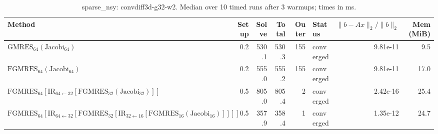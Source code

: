\begin{table}[t]
\centering
\small
\caption{sparse_nsy: convdiff3d-g32-w2. Median over 10 timed runs after 3 warmups; times in ms.}
\label{tab:sparse_nsy-convdiff3d-g32-w2}
\begin{tabular}{lrrrrlrr}
\hline
Method & Setup & Solve & Total & Outer & Status & $\|b-Ax\|_2/\|b\|_2$ & Mem (MiB) \\
\hline
$\mathrm{GMRES}_{64}(\mathrm{Jacobi}_{64})$ & 0.2 & 530.1 & 530.3 & 155 & converged & 9.81e-11 & 9.5 \\
$\mathrm{FGMRES}_{64}(\mathrm{Jacobi}_{64})$ & 0.2 & 555.0 & 555.2 & 155 & converged & 9.81e-11 & 17.0 \\
$\mathrm{FGMRES}_{64}[\mathrm{IR}_{64\leftarrow 32}[\mathrm{FGMRES}_{32}(\mathrm{Jacobi}_{32})]]$ & 0.5 & 805.0 & 805.4 & 2 & converged & 2.42e-16 & 25.4 \\
$\mathrm{FGMRES}_{64}[\mathrm{IR}_{64\leftarrow 32}[\mathrm{FGMRES}_{32}[\mathrm{IR}_{32\leftarrow 16}[\mathrm{FGMRES}_{16}(\mathrm{Jacobi}_{16})]]]]$ & 0.5 & 357.9 & 358.4 & 1 & converged & 1.35e-12 & 24.7 \\
\hline
\end{tabular}
\end{table}
